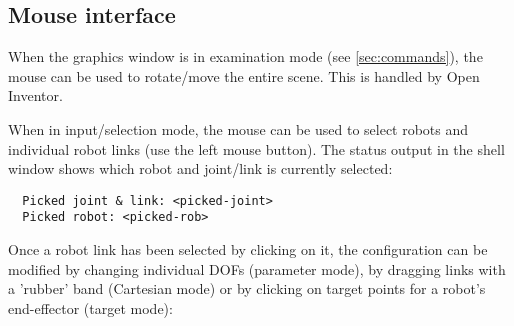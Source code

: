 \documentclass[letter,12pt]{article}
\begin{document}
\subsection{Mouse interface}
\label{sec:mouse}

When the graphics window is in examination mode (see
\ref{sec:commands}), the mouse can be used to rotate/move the entire
scene.  This is handled by Open Inventor.

When in input/selection mode, the mouse can be used to select robots
and individual robot links (use the left mouse button).  The status
output in the shell window shows which robot and joint/link is
currently selected:

\begin{verbatim}
  Picked joint & link: <picked-joint>
  Picked robot: <picked-rob>
\end{verbatim}

Once a robot link has been selected by clicking on it, the
configuration can be modified by changing individual DOFs (parameter
mode), by dragging links with a 'rubber' band (Cartesian mode) or by
clicking on target points for a robot's end-effector (target mode):
\end{document}
